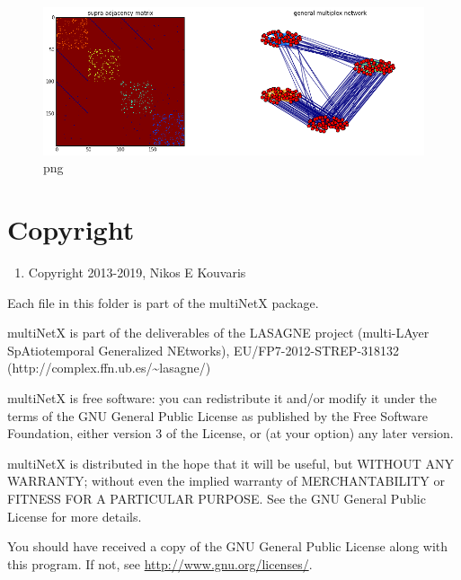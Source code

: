 \documentclass[]{article}
\begin{document}
\begin{figure}[htbp]
\centering
\includegraphics{output_57_0.png}
\caption{png}
\end{figure}

\section{Copyright}\label{copyright}

\begin{enumerate}
\def\labelenumi{(\Alph{enumi})}
\setcounter{enumi}{2}
\itemsep1pt\parskip0pt
\item
  Copyright 2013-2019, Nikos E Kouvaris
\end{enumerate}

Each file in this folder is part of the multiNetX package.

multiNetX is part of the deliverables of the LASAGNE project
(multi-LAyer SpAtiotemporal Generalized NEtworks),
EU/FP7-2012-STREP-318132
(http://complex.ffn.ub.es/\textasciitilde{}lasagne/)

multiNetX is free software: you can redistribute it and/or modify it
under the terms of the GNU General Public License as published by the
Free Software Foundation, either version 3 of the License, or (at your
option) any later version.

multiNetX is distributed in the hope that it will be useful, but WITHOUT
ANY WARRANTY; without even the implied warranty of MERCHANTABILITY or
FITNESS FOR A PARTICULAR PURPOSE. See the GNU General Public License for
more details.

You should have received a copy of the GNU General Public License along
with this program. If not, see \url{http://www.gnu.org/licenses/}.
\end{document}
